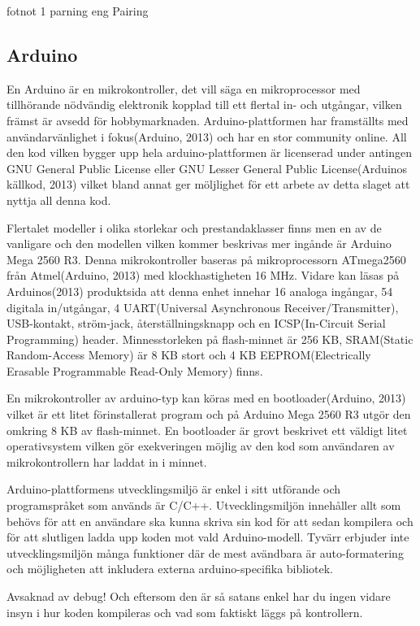 \documentclass[11pt]{article}
\begin{document}
fotnot 1 parning eng Pairing

\subsection{Arduino}
En Arduino är en mikrokontroller, det vill säga en mikroprocessor med tillhörande nödvändig elektronik kopplad till ett flertal in- och utgångar, vilken främst är avsedd för hobbymarknaden. Arduino-plattformen har framställts med användarvänlighet i fokus(Arduino, 2013) och har en stor community online. All den kod vilken bygger upp hela arduino-plattformen är licenserad under antingen GNU General Public License eller GNU Lesser General Public License(Arduinos källkod, 2013) vilket bland annat ger möljlighet för ett arbete av detta slaget att nyttja all denna kod. 

Flertalet modeller i olika storlekar och prestandaklasser finns men en av de vanligare och den modellen vilken kommer beskrivas mer ingånde är Arduino Mega 2560 R3. Denna mikrokontroller baseras på mikroprocessorn ATmega2560 från Atmel(Arduino, 2013) med klockhastigheten 16 MHz. Vidare kan läsas på Arduinos(2013) produktsida att denna enhet innehar 16 analoga ingångar, 54 digitala in/utgångar, 4 UART(Universal Asynchronous Receiver/Transmitter), USB-kontakt, ström-jack, återställningsknapp och en ICSP(In-Circuit Serial Programming) header. Minnesstorleken på flash-minnet är 256 KB, SRAM(Static Random-Access Memory) är 8 KB stort och 4 KB EEPROM(Electrically Erasable Programmable Read-Only Memory) finns.

En mikrokontroller av arduino-typ kan köras med en bootloader(Arduino, 2013) vilket är ett litet förinstallerat program och på Arduino Mega 2560 R3 utgör den omkring 8 KB av flash-minnet. En bootloader är grovt beskrivet ett väldigt litet operativsystem vilken gör exekveringen möjlig av den kod som användaren av mikrokontrollern har laddat in i minnet. 

Arduino-plattformens utvecklingsmiljö är enkel i sitt utförande och programspråket som används är C/C++.  Utvecklingsmiljön innehåller allt som behövs för att en användare ska kunna skriva sin kod för att sedan kompilera och för att slutligen ladda upp koden mot vald Arduino-modell. Tyvärr erbjuder inte utvecklingsmiljön många funktioner där de mest avändbara är auto-formatering och möjligheten att inkludera externa arduino-specifika bibliotek. 

Avsaknad av debug! Och eftersom den är så satans enkel har du ingen vidare insyn i hur koden kompileras och vad som faktiskt läggs på kontrollern.
\end{document}
